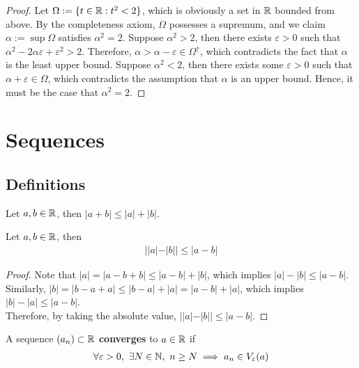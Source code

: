 \documentclass[11pt]{article}
\begin{document}
	\begin{proof}
		Let $\Omega := \{t \in \mathbb{R}: t^2 < 2\}$, which is obviously a set in $\mathbb{R}$ bounded from above. By the completeness axiom, $\Omega$ possesses a supremum, and we claim $\alpha := \sup \Omega$ satisfies $\alpha^2 = 2$. Suppose $\alpha^2 > 2$, then there exists $\varepsilon > 0$ such that $\alpha^2 - 2 \alpha \varepsilon + \varepsilon^2 > 2$. Therefore, $\alpha > \alpha - \varepsilon \in \Omega^\uparrow$, which contradicts the fact that $\alpha$ is the least upper bound. Suppose $\alpha^2 < 2$, then there exists some $\varepsilon > 0$ such that $\alpha + \varepsilon \in \Omega$, which contradicts the assumption that $\alpha$ is an upper bound. Hence, it must be the case that $\alpha^2 = 2$.
	\end{proof}
	
	\section{Sequences}
	\subsection{Definitions}
	\begin{theorem}
		Let $a, b \in \mathbb{R}$, then $|a + b| \leq |a| + |b|$.
	\end{theorem}
	
	\begin{corollary}
		Let $a, b \in \mathbb{R}$, then
		\begin{align}
			| |a| - |b| | \leq |a - b|
		\end{align}
	\end{corollary}
	
	\begin{proof}
		Note that $|a| = |a - b + b| \leq |a - b| + |b|$, which implies $|a| - |b| \leq |a - b|$. \\
		Similarly, $|b| = |b - a + a| \leq |b - a| + |a| = |a - b| + |a|$, which implies $|b| - |a| \leq |a - b|$. \\
		Therefore, by taking the absolute value, $||a| - |b|| \leq |a - b|$.
	\end{proof}
	
	\begin{definition}
		A sequence $(a_n) \subset \mathbb{R}$ \textbf{converges} to $a \in \mathbb{R}$ if 
		\begin{align}
			\forall \varepsilon > 0,\ \exists N \in \mathbb{N},\ n \geq N \implies a_n \in V_\varepsilon(a)
		\end{align}
	\end{definition}
	
\end{document}
